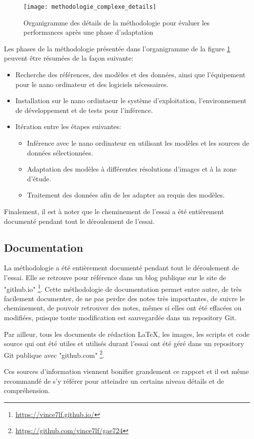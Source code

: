 \label{methodologie_complexe_details}
\begin{figure}[H]
    \centering
    \texttt{[image: methodologie\_complexe\_details]}
    \caption{Organigramme des détails de la méthodologie pour évaluer les performances après une phase d'adaptation}
    \label{fig:methodologie_complexe_details}
\end{figure}
\par Les phases de la méthodologie présentée dans l'organigramme de la figure \ref{fig:methodologie_complexe_details} peuvent être résumées de la façon suivante:
\begin{itemize}
   \item Recherche des références, des modèles et des données, ainsi que l'équipement pour le nano ordinateur et des logiciels nécessaires.
   \item Installation sur le nano ordintaeur le système d'exploitation, l'environnement de développement et de tests pour l'inférence.
   \item Itération entre les étapes suivantes:
   \begin{itemize}
      \item Inférence avec le nano ordinateur en utilisant les modèles et les sources de données sélectionnées.
      \item Adaptation des modèles à différentes résolutions d'images et à la zone d'étude.
      \item Traitement des données afin de les adapter au requis des modèles.
   \end{itemize}
\end{itemize}
\par Finalement, il est à noter  que le cheminement de l'essai a été entièrement documenté pendant tout le déroulement de l'essai.
\subsection{Documentation}
\par La méthodologie a été entièrement documenté pendant tout le déroulement de l'essai. Elle se retrouve pour référence dans un blog publique sur le site de "github.io" \footnote{\url{https://vince7lf.github.io/}}. Cette méthodologie de documentation permet entre autre, de très facilement documenter, de ne pas perdre des notes très importantes, de suivre le cheminement, de pouvoir retrouver des notes, mêmes si elles ont été effacées ou modifiées, puisque toute modification est sauvegardée dans un repository Git.
\par Par ailleur, tous les documents de rédaction LaTeX, les images, les scripts et code source qui ont été utiles et utilisés durant l'essai ont été géré dans un repository Git publique avec "github.com" \footnote{\url{https://github.com/vince7lf/gae724}}. 
\par Ces sources d'information viennent bonifier grandement ce rapport et il est même recommandé de s'y référer pour atteindre un certains niveau détails et de compréhension. 
